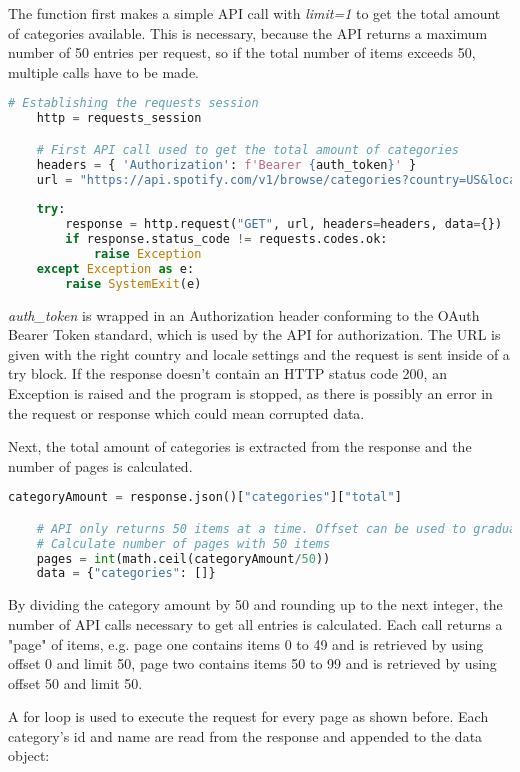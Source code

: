 The function first makes a simple API call with \emph{limit=1} to get the total amount of categories available.
This is necessary, because the API returns a maximum number of 50 entries per request, so if the total number of
items exceeds 50, multiple calls have to be made.

\begin{lstlisting}[language=Python]
    # Establishing the requests session
    http = requests_session

    # First API call used to get the total amount of categories
    headers = { 'Authorization': f'Bearer {auth_token}' }
    url = "https://api.spotify.com/v1/browse/categories?country=US&locale=en_US&limit=1"
    
    try:
        response = http.request("GET", url, headers=headers, data={})
        if response.status_code != requests.codes.ok:
            raise Exception
    except Exception as e:
        raise SystemExit(e)
\end{lstlisting}

\emph{auth\_token} is wrapped in an Authorization header conforming to the OAuth Bearer Token standard,
which is used by the API for authorization.
The URL is given with the right country and locale settings and the request is sent inside of a try block.
If the response doesn't contain an HTTP status code 200, an Exception is raised and the program is stopped,
as there is possibly an error in the request or response which could mean corrupted data.

Next, the total amount of categories is extracted from the response and the number of pages is calculated.

\begin{lstlisting}[language=Python]
    categoryAmount = response.json()["categories"]["total"]

    # API only returns 50 items at a time. Offset can be used to gradually get all items
    # Calculate number of pages with 50 items
    pages = int(math.ceil(categoryAmount/50))
    data = {"categories": []}
\end{lstlisting}

By dividing the category amount by 50 and rounding up to the next integer, the number of API calls necessary to get 
all entries is calculated. Each call returns a "page" of items, e.g. page one contains items 0 to 49 and is retrieved by
using offset 0 and limit 50, page two contains items 50 to 99 and is retrieved by using offset 50 and limit 50.

A for loop is used to execute the request for every page as shown before.
Each category's id and name are read from the response and appended to the data object:

